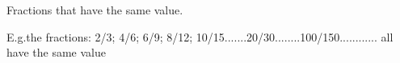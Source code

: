 Fractions that have the same value.
\par
E.g.the fractions:   2/3; 4/6; 6/9; 8/12; 10/15.......20/30........100/150............ 
all have the same value